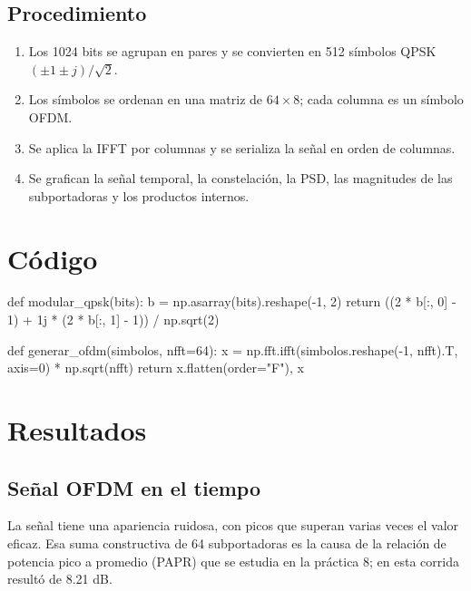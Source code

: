 \documentclass[11pt,a4paper]{article}
\begin{document}
\subsection{Procedimiento}

\begin{enumerate}
  \item Los 1024 bits se agrupan en pares y se convierten en 512 símbolos QPSK
        $(\pm1\pm j)/\sqrt{2}$.
  \item Los símbolos se ordenan en una matriz de $64\times8$; cada columna es un símbolo
        OFDM.
  \item Se aplica la IFFT por columnas y se serializa la señal en orden de columnas.
  \item Se grafican la señal temporal, la constelación, la PSD, las magnitudes de las
        subportadoras y los productos internos.
\end{enumerate}

\section{Código}

\begin{codigo}
def modular_qpsk(bits):
    b = np.asarray(bits).reshape(-1, 2)
    return ((2 * b[:, 0] - 1) + 1j * (2 * b[:, 1] - 1)) / np.sqrt(2)

def generar_ofdm(simbolos, nfft=64):
    x = np.fft.ifft(simbolos.reshape(-1, nfft).T, axis=0) * np.sqrt(nfft)
    return x.flatten(order="F"), x
\end{codigo}

\section{Resultados}

\subsection{Señal OFDM en el tiempo}


La señal tiene una apariencia ruidosa, con picos que superan varias veces el valor eficaz.
Esa suma constructiva de 64 subportadoras es la causa de la relación de potencia pico a
promedio (PAPR) que se estudia en la práctica 8; en esta corrida resultó de 8.21 dB.
\end{document}
